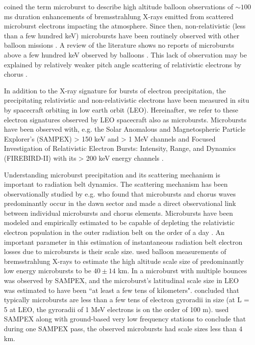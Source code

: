 \citet{Anderson1964} coined the term microburst to describe high altitude balloon observations of $\sim 100$ ms duration enhancements of bremsstrahlung X-rays emitted from scattered microburst electrons impacting the atmosphere. Since then, non-relativistic (less than a few hundred keV) microbursts have been routinely observed with other balloon missions \citep[e.g.][]{Parks1967, Woodger2015, Anderson2017}. A review of the literature shows no reports of microbursts above a few hundred keV observed by balloons \citep{Millan2002, Woodger2015}. This lack of observation may be explained by relatively weaker pitch angle scattering of relativistic electrons by chorus \citep{Lee2012}. 

In addition to the X-ray signature for bursts of electron precipitation, the precipitating relativistic and non-relativistic electrons have been measured in situ by spacecraft orbiting in low earth orbit (LEO). Hereinafter, we refer to these electron signatures observed by LEO spacecraft also as microbursts. Microbursts have been observed with, e.g. the Solar Anomalous and Magnetospheric Particle Explorer's (SAMPEX) > 150 keV and > 1 MeV channels \citep{Nakamura1995, Nakamura2000, Blake1996, Lorentzen2001a, Lorentzen2001b, O'Brien2003, O'Brien2004, Blum2015} and Focused Investigation of Relativistic Electron Bursts: Intensity, Range, and Dynamics (FIREBIRD-II) with its > 200 keV energy channels \citep{Crew2016, Anderson2017, Breneman2017}.

Understanding microburst precipitation and its scattering mechanism is important to radiation belt dynamics. The scattering mechanism has been observationally studied by e.g. \citet{Lorentzen2001b} who found that microbursts and chorus waves predominantly occur in the dawn sector and \citet{Breneman2017} made a direct observational link between individual microbursts and chorus elements. Microbursts have been modeled and empirically estimated to be capable of depleting the relativistic electron population in the outer radiation belt on the order of a day \citep{O'Brien2004, Thorne2005, Shprits2007, Breneman2017}. An important parameter in this estimation of instantaneous radiation belt electron losses due to microbursts is their scale size. \citet{Parks1967} used balloon measurements of bremsstrahlung X-rays to estimate the high altitude scale size of predominantly low energy microbursts to be $40 \pm 14$ km. In \citet{Blake1996} a microburst with multiple bounces was observed by SAMPEX, and the microburst's latitudinal scale size in LEO was estimated to have been ``at least a few tens of kilometers". \citet{Blake1996} concluded that typically microbursts are less than a few tens of electron gyroradii in size (at L = 5 at LEO, the gyroradii of 1 MeV electrons is on the order of 100 m). \citet{Dietrich2010} used SAMPEX along with ground-based very low frequency stations to conclude that during one SAMPEX pass, the observed microbursts had scale sizes less than $4$ km.

